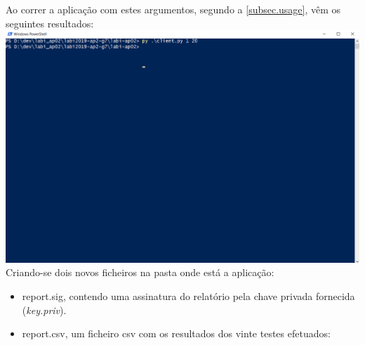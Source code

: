 \documentclass{report}
\begin{document}
Ao correr a aplicação com estes argumentos, segundo a \autoref{subsec.usage}, vêm os seguintes resultados:\\
\includegraphics[width=\textwidth]{useExample2}
Criando-se dois novos ficheiros na pasta onde está a aplicação:
\begin{itemize}
\item report.sig, contendo uma assinatura do relatório pela chave privada fornecida (\textit{key.priv}).
\item report.csv, um ficheiro \ac{csv} com os resultados dos vinte testes efetuados:
\end{itemize}
\end{document}
